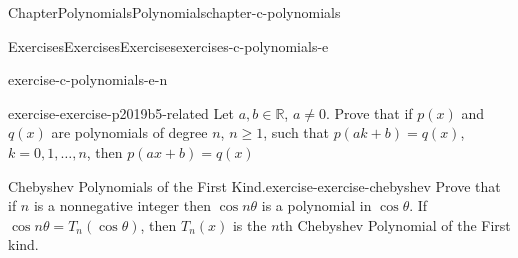 \documentclass[oneside,10pt,]{book}
\numberwithin{equation}{section}
\newcommand{\RR}{\mathbb{R}}
\begin{document}
\begin{chapterptx}{Chapter}{Polynomials}{}{Polynomials}{}{}{chapter-c-polynomials}
\begin{exercises-section}{Exercises}{Exercises}{}{Exercises}{}{}{exercises-c-polynomials-e}
\begin{divisionexercise}{13}{}{}{exercise-c-polynomials-e-n}
\end{divisionexercise}%
\begin{divisionexercise}{14}{}{}{exercise-exercise-p2019b5-related}%
Let \(a, b \in \RR\), \(a \neq 0\). Prove that if \(p(x)\) and \(q(x)\) are polynomials of degree \(n\), \(n \geq 1\), such that \(p(a k +b)=q(x)\), \(k = 0, 1, \dots, n\), then \(p(a x + b)=q(x)\)%
\end{divisionexercise}%
\begin{divisionexercise}{15}{Chebyshev Polynomials of the First Kind.}{}{exercise-exercise-chebyshev}%
%
Prove that if \(n\) is a nonnegative integer then \(\cos{n \theta}\)  is a polynomial in \(\cos{\theta}\). If \(\cos{n \theta} = T_n(\cos{\theta})\), then \(T_n(x)\) is the \(n\)th Chebyshev Polynomial of the First kind.%
\end{divisionexercise}%
\end{exercises-section}
\end{chapterptx}
%
%
\typeout{************************************************}
\typeout{************************************************}
%
\end{document}
